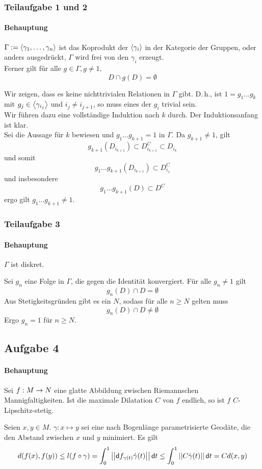 \documentclass{book}
\renewcommand{\d}{\textsf{d}}
\begin{document}
\subsubsection{Teilaufgabe 1 und 2}
\paragraph{Behauptung}
$\Gamma:= \left<\gamma_1,\ldots, \gamma_n\right>$ ist das Koprodukt der $\left<\gamma_i\right>$ in der Kategorie der Gruppen, oder anders ausgedrückt, $\Gamma$ wird frei von den $\gamma_i$ erzeugt.\\
Ferner gilt für alle $g \in \Gamma, g\neq 1,$
\[ D \cap g(D) = \emptyset \]
\begin{Beweis}{}
	Wir zeigen, dass es keine nichttrivialen Relationen in $\Gamma$ gibt. D.\,h., ist $1 = g_1\ldots g_k$ mit $g_j \in \left<\gamma_{i_j}\right>$ und $i_j \neq i_{j+1}$, so muss eines der $g_i$ trivial sein.\\
	Wir führen dazu eine vollständige Induktion nach $k$ durch. Der Induktionsanfang ist klar.\\
	Sei die Aussage für $k$ bewiesen und $g_1 \ldots g_{k+1} = 1$ in $\Gamma$. Da $g_{k+1} \neq 1$, gilt
	\[ g_{k+1}(D_{i_{k+1}}) \subset D_{i_{k+1}}^C \subset D_{i_k} \]
	und somit
	\[ g_1\ldots g_{k+1} (D_{i_{k+1}}) \subset D_{i_1}^C  \]
	und insbesondere
	\[ g_1\ldots g_{k+1} (D) \subset D^C  \]
	ergo gilt $ g_1\ldots g_{k+1}\neq 1$.
\end{Beweis}

\subsubsection{Teilaufgabe 3}
\paragraph{Behauptung}
$\Gamma$ ist diskret.
\begin{Beweis}{}
	Sei $g_n$ eine Folge in $\Gamma$, die gegen die Identität konvergiert. Für alle $g_n \neq 1$ gilt
	\[ g_n(D) \cap D = \emptyset \]
	Aus Stetigkeitsgründen gibt es ein $N$, sodass für alle $n\geq N$ gelten muss
	\[ g_n(D)\cap D \neq\emptyset \]
	Ergo $g_n = 1$ für $n\geq N$.
\end{Beweis}

\subsection{Aufgabe 4}
\paragraph{Behauptung}
Sei $f :M \overset{}{\rightarrow} N$ eine glatte Abbildung zwischen Riemannschen Mannigfaltigkeiten. Ist die maximale Dilatation $C$ von $f$ endlich, so ist $f$ $C$-Lipschitz-stetig.
\begin{Beweis}{}
	Seien $x,y \in M$. $\gamma : x\mapsto y$ sei eine nach Bogenlänge parametrisierte Geodäte, die den Abstand zwischen $x$ und $y$ minimiert. Es gilt
	\[ d(f(x), f(y) ) \leq l(f\circ \gamma) = \int_{0}^1 \norm{ \d f_{\gamma(t)} \dot{\gamma}(t) }\d t\leq \int_{0}^1 \norm{ C\dot{\gamma}(t) }\d t = C d(x,y) \]
\end{Beweis}
\end{document}
